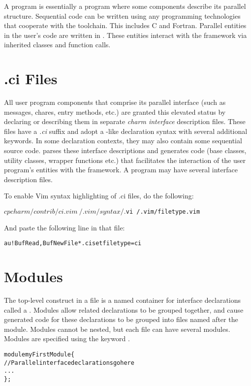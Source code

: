 A \charm program is essentially a \CC program where some components describe
its parallel structure. Sequential code can be written using any programming
technologies that cooperate with the \CC toolchain. This includes C and
Fortran. Parallel entities in the user's code are written in \CC{}. These
entities interact with the \charm framework via inherited classes and function
calls.


\section{.ci Files}
All user program components that comprise its parallel interface (such as
messages, chares, entry methods, etc.) are granted this elevated status by
declaring or describing them in separate \emph{charm interface} description
files. These files have a \emph{.ci} suffix and adopt a \CC-like declaration
syntax with several additional keywords. In some declaration contexts, they
may also contain some sequential \CC source code.
\charm parses these interface descriptions and generates \CC code (base
classes, utility classes, wrapper functions etc.) that facilitates the
interaction of the user program's entities with the framework.  A program may
have several interface description files.

To enable Vim syntax highlighting of .ci files, do the following:

\begin{alltt}
$ cp charm/contrib/ci.vim ~/.vim/syntax/.
$ vi ~/.vim/filetype.vim
\end{alltt}

And paste the following line in that file:
\begin{alltt}
au! BufRead,BufNewFile *.ci set filetype=ci
\end{alltt}


\section{Modules}
The top-level construct in a \ci file is a named container for interface
declarations called a . Modules allow related declarations to be
grouped together, and cause generated code for these declarations to be grouped
into files named after the module. Modules cannot be nested, but each \ci file
can have several modules. Modules are specified using the keyword .

\begin{alltt}
module myFirstModule \{
    // Parallel interface declarations go here
    ...
\};
\end{alltt}


